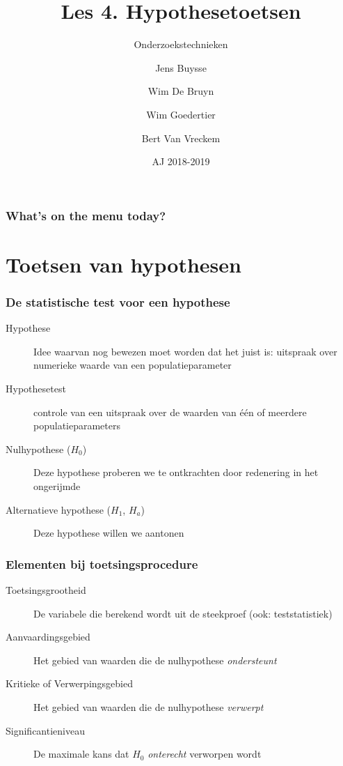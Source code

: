 \documentclass[aspectratio=169]{beamer}
\title[OZT: hypothesetoetsen]{Les 4. Hypothesetoetsen}
\subtitle{Onderzoekstechnieken}
\author{Jens Buysse \and Wim {De Bruyn} \and Wim Goedertier \and Bert {Van Vreckem}}
\date{AJ 2018-2019}
\begin{document}

\begin{frame}
\maketitle
\end{frame}



\begin{frame}
  \frametitle{What's on the menu today?}

  \tableofcontents
\end{frame}

\section{Toetsen van hypothesen}

\begin{frame}
  \frametitle{De statistische test voor een hypothese}

  \begin{description}
    \item[Hypothese] Idee waarvan nog bewezen moet worden dat het juist is: uitspraak over numerieke waarde van een populatieparameter
    \item[Hypothesetest] controle van een uitspraak over de waarden van één of meerdere populatieparameters
    \item[Nulhypothese ($H_0$)] Deze hypothese proberen we te ontkrachten door redenering in het ongerijmde
    \item[Alternatieve hypothese ($H_1$, $H_a$)] Deze hypothese willen we aantonen
  \end{description}
\end{frame}

\begin{frame}
  \frametitle{Elementen bij toetsingsprocedure}

  \begin{description}
    \item[Toetsingsgrootheid] De variabele die berekend wordt uit de steekproef (ook: teststatistiek)
    \item[Aanvaardingsgebied] Het gebied van waarden die de nulhypothese \emph{ondersteunt}
    \item[Kritieke of Verwerpingsgebied] Het gebied van waarden die de nulhypothese \emph{verwerpt}
    \item[Significantieniveau] De maximale kans dat $H_0$ \emph{onterecht} verworpen wordt
  \end{description}
\end{frame}
\end{document}
